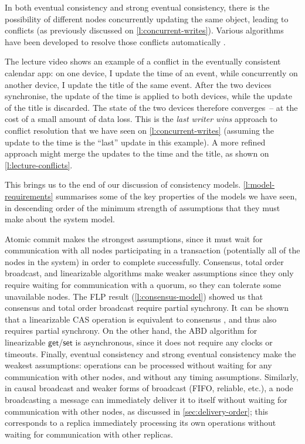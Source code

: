 In both eventual consistency and strong eventual consistency, there is the possibility of different nodes concurrently updating the same object, leading to conflicts (as previously discussed on \autoref{l:concurrent-writes}).
Various algorithms have been developed to resolve those conflicts automatically \citep{Shapiro:2011}.

The lecture video shows an example of a conflict in the eventually consistent calendar app: on one device, I update the time of an event, while concurrently on another device, I update the title of the same event.
After the two devices synchronise, the update of the time is applied to both devices, while the update of the title is discarded.
The state of the two devices therefore converges~-- at the cost of a small amount of data loss.
This is the \emph{last writer wins} approach to conflict resolution that we have seen on \autoref{l:concurrent-writes} (assuming the update to the time is the ``last'' update in this example).
A more refined approach might merge the updates to the time and the title, as shown on \autoref{l:lecture-conflicts}.

This brings us to the end of our discussion of consistency models.
\autoref{l:model-requirements} summarises some of the key properties of the models we have seen, in descending order of the minimum strength of assumptions that they must make about the system model.

Atomic commit makes the strongest assumptions, since it must wait for communication with all nodes participating in a transaction (potentially all of the nodes in the system) in order to complete successfully.
Consensus, total order broadcast, and linearizable algorithms make weaker assumptions since they only require waiting for communication with a quorum, so they can tolerate some unavailable nodes.
The FLP result (\autoref{l:consensus-model}) showed us that consensus and total order broadcast require partial synchrony.
It can be shown that a linearizable CAS operation is equivalent to consensus \citep{Herlihy:1991}, and thus also requires partial synchrony.
On the other hand, the ABD algorithm for linearizable $\mathsf{get}$/$\mathsf{set}$ is asynchronous, since it does not require any clocks or timeouts.
Finally, eventual consistency and strong eventual consistency make the weakest assumptions: operations can be processed without waiting for any communication with other nodes, and without any timing assumptions.
Similarly, in causal broadcast and weaker forms of broadcast (FIFO, reliable, etc.), a node broadcasting a message can immediately deliver it to itself without waiting for communication with other nodes, as discussed in \autoref{sec:delivery-order}; this corresponds to a replica immediately processing its own operations without waiting for communication with other replicas.

